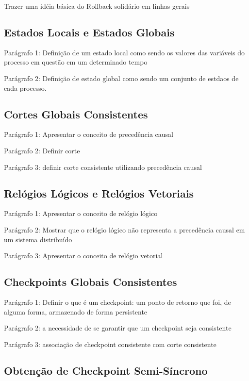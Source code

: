 Trazer uma idéia básica do Rollback solidário em linhas gerais

\subsection{Estados Locais e Estados Globais}

Parágrafo 1: Definição de um estado local como sendo os valores das variáveis do processo em questão em um determinado tempo

Parágrafo 2: Definição de estado global como sendo um conjunto de estdaos de cada processo.

\subsection{Cortes Globais Consistentes}

Parágrafo 1: Apresentar o conceito de precedência causal

Parágrafo 2: Definir corte 

Parágrafo 3: definir corte consistente utilizando precedência causal

\subsection{Relógios Lógicos e Relógios Vetoriais}

Parágrafo 1: Apresentar o conceito de relógio lógico

Parágrafo 2: Mostrar que o relógio lógico não representa a precedência causal em um sistema distribuído

Parágrafo 3: Apresentar o conceito de relógio vetorial

\subsection{Checkpoints Globais Consistentes}

Parágrafo 1: Definir o que é um checkpoint: um ponto de retorno que foi, de alguma forma, armazenado de forma persistente

Parágrafo 2: a necessidade de se garantir que um checkpoint seja consistente

Parágrafo 3: associação de checkpoint consistente com corte consistente

\subsection{Obtenção de Checkpoint Semi-Síncrono}

